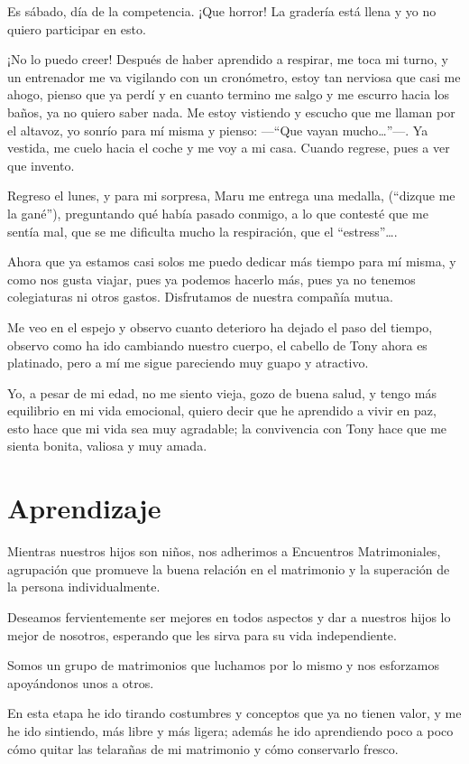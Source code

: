 \documentclass[letterpaper, 12pt]{book}
\begin{document}
Es sábado, día de la competencia. ¡Que horror! La gradería está llena y yo no quiero participar en esto. 

¡No lo puedo creer! Después de haber aprendido a respirar, me toca mi turno, y un entrenador me va vigilando con un cronómetro, estoy tan nerviosa que casi me ahogo, pienso que ya perdí y en cuanto termino me salgo y me escurro hacia los baños, ya no quiero saber nada. Me estoy vistiendo y escucho que me llaman por el altavoz, yo  sonrío para mí misma y pienso: ---``Que vayan mucho\ldots''---.  Ya vestida, me cuelo hacia el coche y me voy a mi casa. Cuando regrese, pues a ver que invento.

Regreso el lunes, y para mi sorpresa, Maru me entrega una medalla, (``dizque me la gané''), preguntando qué había pasado conmigo, a lo que contesté que me sentía mal, que se me dificulta mucho la respiración, que el ``estress''\ldots.

Ahora que ya estamos casi solos me puedo dedicar más tiempo para mí misma, y como nos gusta viajar, pues ya podemos hacerlo más, pues ya no tenemos colegiaturas ni otros gastos. Disfrutamos de nuestra compañía mutua.

Me veo en el espejo y observo cuanto deterioro ha dejado el paso del tiempo, observo como ha ido cambiando nuestro cuerpo, el cabello de Tony ahora es platinado, pero a mí me sigue pareciendo muy guapo y atractivo.

Yo, a pesar de mi edad, no me siento vieja, gozo de buena salud, y tengo más equilibrio en mi vida emocional, quiero decir que he aprendido a vivir en paz, esto hace que mi vida sea muy agradable; la convivencia con Tony hace que me sienta bonita, valiosa y muy amada.

\chapter{Aprendizaje}
Mientras nuestros hijos son niños, nos adherimos a Encuentros Matrimoniales, agrupación que promueve la buena relación en el matrimonio y la superación de la persona individualmente.

Deseamos fervientemente ser mejores en todos aspectos y dar a nuestros hijos lo mejor de nosotros, esperando que les sirva para su vida independiente.

Somos un grupo de matrimonios que luchamos por lo mismo y nos esforzamos apoyándonos unos a otros.

En esta etapa he ido tirando costumbres y conceptos que ya no tienen valor, y me he ido sintiendo, más libre y más ligera;
además he ido aprendiendo poco a poco cómo quitar las telarañas de mi matrimonio y cómo conservarlo fresco.
\end{document}
